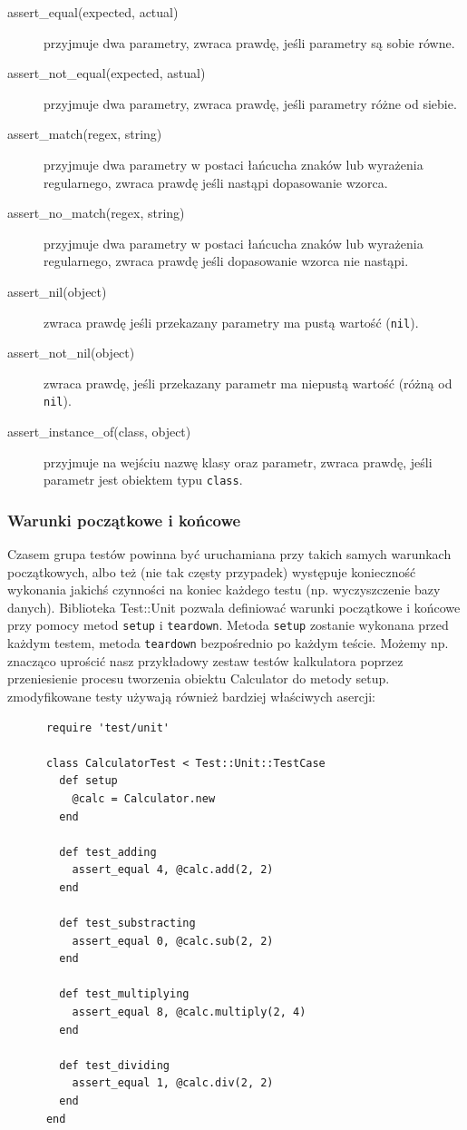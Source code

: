      \begin{description}
       \item[assert\_equal(expected, actual)] przyjmuje dwa parametry, zwraca prawdę, jeśli parametry są sobie równe.
       \item[assert\_not\_equal(expected, astual)] przyjmuje dwa parametry, zwraca prawdę, jeśli parametry różne od siebie.
       \item[assert\_match(regex, string)] przyjmuje dwa parametry w postaci łańcucha znaków lub wyrażenia regularnego, zwraca prawdę jeśli nastąpi dopasowanie wzorca.
       \item[assert\_no\_match(regex, string)] przyjmuje dwa parametry w postaci łańcucha znaków lub wyrażenia regularnego, zwraca prawdę jeśli dopasowanie wzorca nie nastąpi.
       \item[assert\_nil(object)] zwraca prawdę jeśli przekazany parametry ma pustą wartość (\verb+nil+).
       \item[assert\_not\_nil(object)] zwraca prawdę, jeśli przekazany parametr ma niepustą wartość (różną od \verb+nil+).
       \item[assert\_instance\_of(class, object)] przyjmuje na wejściu nazwę klasy oraz parametr, zwraca prawdę, jeśli parametr jest obiektem typu \verb+class+.
    \end{description}
    
    \subsubsection{Warunki początkowe i końcowe}
    Czasem grupa testów powinna być uruchamiana przy takich samych warunkach początkowych, albo też (nie tak częsty przypadek) występuje konieczność wykonania jakichś czynności na koniec każdego testu (np. wyczyszczenie bazy danych). Biblioteka Test::Unit pozwala definiować warunki początkowe i końcowe przy pomocy metod \verb+setup+ i \verb+teardown+.
    Metoda \verb+setup+ zostanie wykonana przed każdym testem, metoda \verb+teardown+ bezpośrednio po każdym teście. Możemy np. znacząco uprościć nasz przykładowy zestaw testów kalkulatora poprzez przeniesienie procesu tworzenia obiektu Calculator do metody setup. zmodyfikowane testy używają również bardziej właściwych asercji:
    
    \begin{verbatim}
      require 'test/unit'
      
      class CalculatorTest < Test::Unit::TestCase
        def setup
          @calc = Calculator.new
        end
      
        def test_adding
          assert_equal 4, @calc.add(2, 2)
        end
        
        def test_substracting
          assert_equal 0, @calc.sub(2, 2)
        end
        
        def test_multiplying
          assert_equal 8, @calc.multiply(2, 4)
        end
        
        def test_dividing
          assert_equal 1, @calc.div(2, 2)
        end
      end
    \end{verbatim}
    
